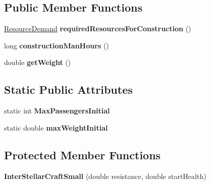 \subsection*{Public Member Functions}
\begin{DoxyCompactItemize}
\item 
\hyperlink{classuniverse_1_1_resource_demand}{Resource\+Demand} {\bfseries required\+Resources\+For\+Construction} ()\hypertarget{classtools_1_1vehicles_1_1space_1_1_inter_stellar_craft_small_a606380a49d43b5a63676611944630267}{}\label{classtools_1_1vehicles_1_1space_1_1_inter_stellar_craft_small_a606380a49d43b5a63676611944630267}

\item 
long {\bfseries construction\+Man\+Hours} ()\hypertarget{classtools_1_1vehicles_1_1space_1_1_inter_stellar_craft_small_aa7ae51fcb58dafb3636146a2fc7d87b3}{}\label{classtools_1_1vehicles_1_1space_1_1_inter_stellar_craft_small_aa7ae51fcb58dafb3636146a2fc7d87b3}

\item 
double {\bfseries get\+Weight} ()\hypertarget{classtools_1_1vehicles_1_1space_1_1_inter_stellar_craft_small_adfb614d7b3a363b09a3113dc73d544a6}{}\label{classtools_1_1vehicles_1_1space_1_1_inter_stellar_craft_small_adfb614d7b3a363b09a3113dc73d544a6}

\end{DoxyCompactItemize}
\subsection*{Static Public Attributes}
\begin{DoxyCompactItemize}
\item 
static int {\bfseries Max\+Passengers\+Initial}\hypertarget{classtools_1_1vehicles_1_1space_1_1_inter_stellar_craft_small_a9e2055217735df703655fd7fb476fb4c}{}\label{classtools_1_1vehicles_1_1space_1_1_inter_stellar_craft_small_a9e2055217735df703655fd7fb476fb4c}

\item 
static double {\bfseries max\+Weight\+Initial}\hypertarget{classtools_1_1vehicles_1_1space_1_1_inter_stellar_craft_small_a5329367ced6b25cc7e138a56b548dbda}{}\label{classtools_1_1vehicles_1_1space_1_1_inter_stellar_craft_small_a5329367ced6b25cc7e138a56b548dbda}

\end{DoxyCompactItemize}
\subsection*{Protected Member Functions}
\begin{DoxyCompactItemize}
\item 
{\bfseries Inter\+Stellar\+Craft\+Small} (double resistance, double start\+Health)\hypertarget{classtools_1_1vehicles_1_1space_1_1_inter_stellar_craft_small_a442dad791fe60a96e146636a2fc719fc}{}\label{classtools_1_1vehicles_1_1space_1_1_inter_stellar_craft_small_a442dad791fe60a96e146636a2fc719fc}

\end{DoxyCompactItemize}
